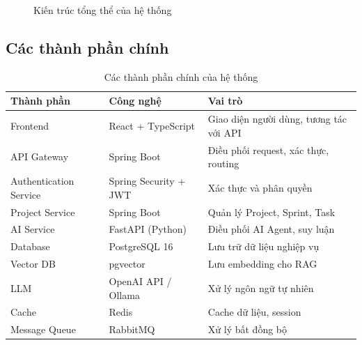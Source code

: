 \documentclass[12pt,a4paper]{report}
\begin{document}
\begin{figure}[H]
\centering
{}
\caption{Kiến trúc tổng thể của hệ thống}
\label{fig:overall_architecture}
\end{figure}

\subsection{Các thành phần chính}

\begin{table}[H]
\centering
\caption{Các thành phần chính của hệ thống}
\begin{tabular}{|p{4cm}|p{4cm}|p{7cm}|}
\hline
\textbf{Thành phần} & \textbf{Công nghệ} & \textbf{Vai trò} \\
\hline
Frontend & React + TypeScript & Giao diện người dùng, tương tác với API \\
\hline
API Gateway & Spring Boot & Điều phối request, xác thực, routing \\
\hline
Authentication Service & Spring Security + JWT & Xác thực và phân quyền \\
\hline
Project Service & Spring Boot & Quản lý Project, Sprint, Task \\
\hline
AI Service & FastAPI (Python) & Điều phối AI Agent, suy luận \\
\hline
Database & PostgreSQL 16 & Lưu trữ dữ liệu nghiệp vụ \\
\hline
Vector DB & pgvector & Lưu embedding cho RAG \\
\hline
LLM & OpenAI API / Ollama & Xử lý ngôn ngữ tự nhiên \\
\hline
Cache & Redis & Cache dữ liệu, session \\
\hline
Message Queue & RabbitMQ & Xử lý bất đồng bộ \\
\hline
\end{tabular}
\label{tab:components}
\end{table}
\end{document}
